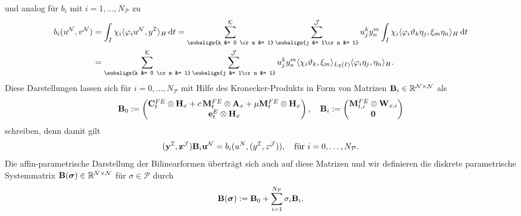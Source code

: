 \documentclass[../main.tex]{subfiles}
\begin{document}
und analog für $b_{i}$ mit $i = 1, \dots, N_{\mathcal P}$ zu
\begin{align}
    b_{i}(u^{\mathcal N}, v^{\mathcal N})
    &= \int_{I} \chi_{i} \skp{\varphi_{i} u^{\mathcal N}}{y^{\mathcal I}}{H} \diff t
    = \sum_{\subalign{k &= 0 \cr m &= 1}}^{\mathcal K} \sum_{\subalign{j &= 1\cr n &= 1}}^{\mathcal J} u^{k}_{j} y^{m}_{n} \int_{I} \chi_{i} \skp{\varphi_{i} \theta_{k} \eta_{j}}{\xi_{m} \eta_{n}}{H} \diff t
    \\&= \sum_{\subalign{k &= 0 \cr m &= 1}}^{\mathcal K} \sum_{\subalign{j &= 1\cr n &= 1}}^{\mathcal J} u^{k}_{j} y^{m}_{n} \skp{\chi_{i} \theta_{k}}{\xi_{m}}{L_{2}(I)} \skp{\varphi_{i} \eta_{j}}{\eta_{n}}{H}.
\end{align}
Diese Darstellungen lassen sich für $i = 0, \dots, N_{\mathcal P}$ mit Hilfe des Kronecker-Produkts in Form von Matrizen $\mathbf{B}_{i} \in \mathbb{R}^{\mathcal N \times \mathcal N}$ als
\begin{equation}
    \mathbf{B}_{0} := \begin{pmatrix}
    \mathbf{C}_{t}^{FE} \otimes \mathbf{H}_{x} + c\,\mathbf{M}_{t}^{FE} \otimes \mathbf{A}_{x} + \mu \mathbf{M}_{t}^{FE} \otimes \mathbf{H}_{x} \\
    \mathbf{e}_{t}^{E} \otimes \mathbf{H}_{x}
    \end{pmatrix}, \quad
    \mathbf{B}_{i} :=  \begin{pmatrix}
    \mathbf{M}_{t,i}^{FE} \otimes \mathbf{W}_{x,i} \\
    \mathbf{0}
    \end{pmatrix}
\end{equation}
schreiben, denn damit gilt
\begin{equation}
    (\mathbf{y}^{\mathcal I}, \mathbf{z}^{\mathcal J}) \mathbf{B}_{i} \mathbf{u}^{\mathcal N} = b_{i}(u^{N}, (y^{\mathcal I}, z^{\mathcal J})), \quad \text{für } i = 0, \dots, N_{\mathcal P}.
\end{equation}
Die affin-parametrische Darstellung der Bilinearformen überträgt sich auch auf diese Matrizen und wir definieren die diskrete parametrische Systemmatrix $\mathbf{B}(\bm \sigma) \in \mathbb{R}^{\mathcal N \times \mathcal N}$ für $\sigma \in \mathcal P$ durch
\begin{equation}
    \mathbf{B}(\bm \sigma) := \mathbf{B}_{0} + \sum_{i = 1}^{N_{\mathcal P}} \sigma_{i} \mathbf{B}_{i}.
\end{equation}
\end{document}
